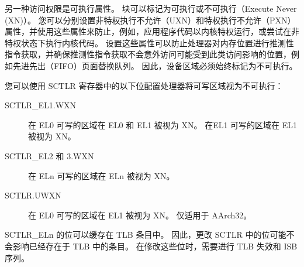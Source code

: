 另一种访问权限是可执行属性。
块可以标记为可执行或不可执行（Execute Never (XN)）。
您可以分别设置非特权执行不允许（UXN）和特权执行不允许（PXN）属性，并使用这些属性来防止，例如，应用程序代码以内核特权运行，或尝试在非特权状态下执行内核代码。
设置这些属性可以防止处理器对内存位置进行推测性指令获取，并确保推测性指令获取不会意外访问可能受到此类访问影响的位置，例如先进先出（FIFO）页面替换队列。
因此，设备区域必须始终标记为不可执行。


您可以使用 SCTLR 寄存器中的以下位配置处理器将可写区域视为不可执行：

\begin{description}
  \item[SCTLR\_EL1.WXN] 在 EL0 可写的区域在 EL0 和 EL1 被视为 XN。
  在EL1 可写的区域在 EL1 被视为 XN。
  \item[SCTLR\_EL2 和 3.WXN] 在 ELn 可写的区域在 ELn 被视为 XN。
  \item[SCTLR.UWXN] 在 EL0 可写的区域在 EL1 被视为 XN。
  仅适用于 AArch32。
\end{description}

SCTLR\_ELn 的位可以缓存在 TLB 条目中。
因此，更改 SCTLR 中的位可能不会影响已经存在于 TLB 中的条目。
在修改这些位时，需要进行 TLB 失效和 ISB 序列。


